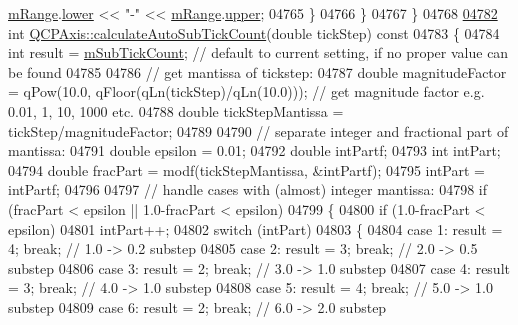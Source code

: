 \begin{DoxyCode}
      \hyperlink{a00025_a1ee36773c49062d751560e11f90845f7}{mRange}.\hyperlink{a00049_aa3aca3edb14f7ca0c85d912647b91745}{lower} << \textcolor{stringliteral}{"-"} << \hyperlink{a00025_a1ee36773c49062d751560e11f90845f7}{mRange}.\hyperlink{a00049_ae44eb3aafe1d0e2ed34b499b6d2e074f}{upper};
04765     \}
04766   \}
04767 \}
04768 
\hypertarget{a00115_source_l04782}{}\hyperlink{a00025_a3c5c045019fcdc0843a3e064eda7478a}{04782} \textcolor{keywordtype}{int} \hyperlink{a00025_a3c5c045019fcdc0843a3e064eda7478a}{QCPAxis::calculateAutoSubTickCount}(\textcolor{keywordtype}{double} tickStep)\textcolor{keyword}{ const}
04783 \textcolor{keyword}{}\{
04784   \textcolor{keywordtype}{int} result = \hyperlink{a00025_ad70198e6ae2801fc409bc3caec707da9}{mSubTickCount}; \textcolor{comment}{// default to current setting, if no proper value can be found}
04785   
04786   \textcolor{comment}{// get mantissa of tickstep:}
04787   \textcolor{keywordtype}{double} magnitudeFactor = qPow(10.0, qFloor(qLn(tickStep)/qLn(10.0))); \textcolor{comment}{// get magnitude factor e.g. 0.01,
       1, 10, 1000 etc.}
04788   \textcolor{keywordtype}{double} tickStepMantissa = tickStep/magnitudeFactor;
04789   
04790   \textcolor{comment}{// separate integer and fractional part of mantissa:}
04791   \textcolor{keywordtype}{double} epsilon = 0.01;
04792   \textcolor{keywordtype}{double} intPartf;
04793   \textcolor{keywordtype}{int} intPart;
04794   \textcolor{keywordtype}{double} fracPart = modf(tickStepMantissa, &intPartf);
04795   intPart = intPartf;
04796   
04797   \textcolor{comment}{// handle cases with (almost) integer mantissa:}
04798   \textcolor{keywordflow}{if} (fracPart < epsilon || 1.0-fracPart < epsilon)
04799   \{
04800     \textcolor{keywordflow}{if} (1.0-fracPart < epsilon)
04801       intPart++;
04802     \textcolor{keywordflow}{switch} (intPart)
04803     \{
04804       \textcolor{keywordflow}{case} 1: result = 4; \textcolor{keywordflow}{break}; \textcolor{comment}{// 1.0 -> 0.2 substep}
04805       \textcolor{keywordflow}{case} 2: result = 3; \textcolor{keywordflow}{break}; \textcolor{comment}{// 2.0 -> 0.5 substep}
04806       \textcolor{keywordflow}{case} 3: result = 2; \textcolor{keywordflow}{break}; \textcolor{comment}{// 3.0 -> 1.0 substep}
04807       \textcolor{keywordflow}{case} 4: result = 3; \textcolor{keywordflow}{break}; \textcolor{comment}{// 4.0 -> 1.0 substep}
04808       \textcolor{keywordflow}{case} 5: result = 4; \textcolor{keywordflow}{break}; \textcolor{comment}{// 5.0 -> 1.0 substep}
04809       \textcolor{keywordflow}{case} 6: result = 2; \textcolor{keywordflow}{break}; \textcolor{comment}{// 6.0 -> 2.0 substep}

\end{DoxyCode}
